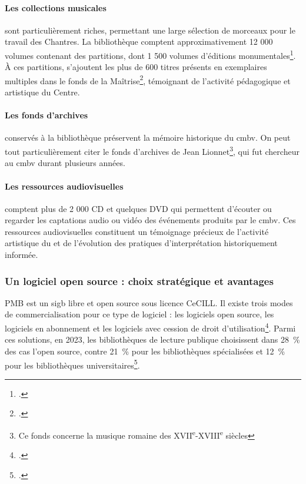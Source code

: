 \paragraph{Les collections musicales} sont particulièrement riches, permettant une large sélection de morceaux pour le travail des Chantres. La bibliothèque comptent approximativement 12 000 volumes contenant des partitions, dont 1 500 volumes d'éditions monumentales\footcite{CentreMusiqueBaroqueb}. À ces partitions, s'ajoutent les plus de 600 titres présents en exemplaires multiples dans le fonds de la Maîtrise\footcite{CentreMusiqueBaroqueb}, témoignant de l'activité pédagogique et artistique du Centre.

\paragraph{Les fonds d'archives} conservés à la bibliothèque préservent la mémoire historique du \gls{cmbv}. On peut tout particulièrement citer le fonds d'archives de Jean Lionnet\footnote{Ce fonds concerne la musique romaine des XVII\textsuperscript{e}-XVIII\textsuperscript{e} siècles}, qui fut chercheur au \gls{cmbv} durant plusieurs années.

\paragraph{Les ressources audiovisuelles} comptent plus de 2 000 CD et quelques DVD qui permettent d'écouter ou regarder les captations audio ou vidéo des événements produits par le \gls{cmbv}. Ces ressources audiovisuelles constituent un témoignage précieux de l'activité artistique du  et de l'évolution des pratiques d'interprétation historiquement informée.

\subsubsection{Un logiciel open source : choix stratégique et avantages}

PMB est un \gls{sigb} libre et open source sous licence CeCILL. Il existe trois modes de commercialisation pour ce type de logiciel : les logiciels open source, les logiciels en abonnement et les logiciels avec cession de droit d'utilisation\footcite{maisonneuveLogicielsPourBibliotheques2021}. Parmi ces solutions, en 2023, les bibliothèques de lecture publique choisissent dans 28~\% des cas l'open source, contre 21~\% pour les bibliothèques spécialisées et 12~\% pour les bibliothèques universitaires\footcite{asselinLogicielsPourBibliotheques2024}.

